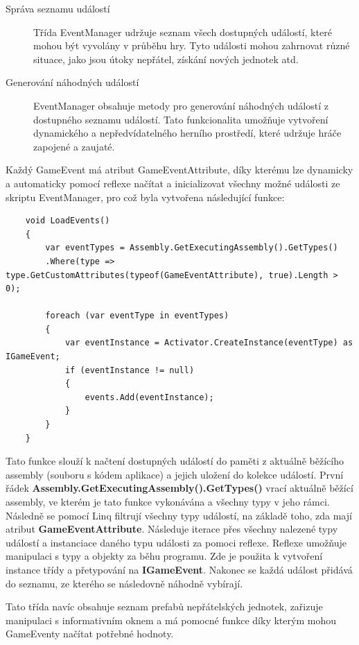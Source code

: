 \begin{description}
	\item[Správa seznamu událostí] Třída EventManager udržuje seznam všech dostupných událostí, které mohou být vyvolány v průběhu hry. Tyto události mohou zahrnovat různé situace, jako jsou útoky nepřátel, získání nových jednotek atd.
	\item[Generování náhodných událostí] EventManager obsahuje metody pro generování náhodných událostí z dostupného seznamu událostí. Tato funkcionalita umožňuje vytvoření dynamického a nepředvídatelného herního prostředí, které udržuje hráče zapojené a zaujaté.
\end{description}

Každý GameEvent má atribut GameEventAttribute, díky kterému lze dynamicky a automaticky pomocí reflexe načítat a inicializovat všechny možné události ze skriptu EventManager, pro což byla vytvořena následující funkce:

\begin{lstlisting}
	void LoadEvents()
	{
		var eventTypes = Assembly.GetExecutingAssembly().GetTypes()
		.Where(type => type.GetCustomAttributes(typeof(GameEventAttribute), true).Length > 0);

		foreach (var eventType in eventTypes)
		{
			var eventInstance = Activator.CreateInstance(eventType) as IGameEvent;
			if (eventInstance != null)
			{
				events.Add(eventInstance);
			}
		}
	}
\end{lstlisting}

Tato funkce slouží k načtení dostupných událostí do paměti z aktuálně běžícího assembly (souboru s kódem aplikace) a jejich uložení do kolekce událostí. První řádek \textbf{Assembly.GetExecutingAssembly().GetTypes()} vrací aktuálně běžící assembly, ve kterém je tato funkce vykonávána a všechny typy v jeho rámci. Následně se pomocí Linq filtrují všechny typy událostí, na základě toho, zda mají atribut \textbf{GameEventAttribute}. Následuje iterace přes všechny nalezené typy událostí a instanciace daného typu události za pomoci reflexe. Reflexe umožňuje manipulaci s typy a objekty za běhu programu. Zde je použita k vytvoření instance třídy a přetypování na \textbf{IGameEvent}. Nakonec se každá událost přidává do seznamu, ze kterého se následovně náhodně vybírají.

Tato třída navíc obsahuje seznam prefabů nepřátelských jednotek, zařizuje manipulaci s informativním oknem a má pomocné funkce díky kterým mohou GameEventy načítat potřebné hodnoty.

